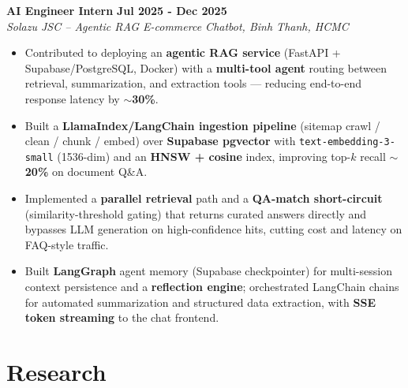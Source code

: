 \documentclass[a4paper,10pt]{article}
\begin{document}
\vspace{0.3em}
\noindent\textbf{AI Engineer Intern} \hfill \textbf{Jul 2025 - Dec 2025} \\
\textit{Solazu JSC -- Agentic RAG E-commerce Chatbot, Binh Thanh, HCMC} \\
\vspace{-0.3em}
\begin{itemize}[leftmargin=1.2em, itemsep=0.05em, parsep=0pt, topsep=0pt]
    \item Contributed to deploying an \textbf{agentic RAG service} (FastAPI + Supabase/PostgreSQL, Docker) with a \textbf{multi-tool agent} routing between retrieval, summarization, and extraction tools — reducing end-to-end response latency by \textbf{$\sim$30\%}.
    \item Built a \textbf{LlamaIndex/LangChain ingestion pipeline} (sitemap crawl / clean / chunk / embed) over \textbf{Supabase pgvector} with \texttt{text-embedding-3-small} (1536-dim) and an \textbf{HNSW + cosine} index, improving top-$k$ recall \textbf{$\sim$20\%} on document Q\&A.
    \item Implemented a \textbf{parallel retrieval} path and a \textbf{QA-match short-circuit} (similarity-threshold gating) that returns curated answers directly and bypasses LLM generation on high-confidence hits, cutting cost and latency on FAQ-style traffic.
    \item Built \textbf{LangGraph} agent memory (Supabase checkpointer) for multi-session context persistence and a \textbf{reflection engine}; orchestrated LangChain chains for automated summarization and structured data extraction, with \textbf{SSE token streaming} to the chat frontend.
\end{itemize}

\section{Research}
\end{document}
